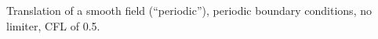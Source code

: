 Translation of a smooth field (``periodic''), periodic boundary conditions, no limiter, CFL of 0.5.
